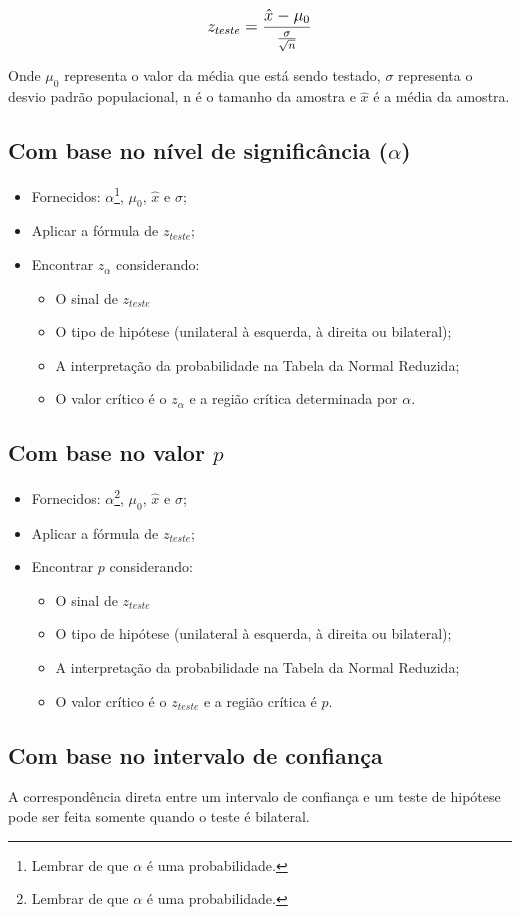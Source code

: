\[\beq{ z_{teste} = \frac{\hat{x}-\mu_0}{\frac{\sigma}{\sqrt{n}}} } \]

Onde \(\mu_0\) representa o valor da média que está sendo testado, \(\sigma\) representa o desvio padrão populacional, n é o tamanho da amostra e \(\hat{x}\) é a média da amostra.

\subsection{Com base no nível de significância (\(\alpha\))}

\begin{itemize}
	\item Fornecidos: \(\alpha\)\footnote{Lembrar de que \(\alpha\) é uma probabilidade.}, \(\mu_0\), \(\hat{x}\) e \(\sigma\);
	\item Aplicar a fórmula de \(z_{teste}\);
	\item Encontrar \(z_{\alpha}\) considerando:
	\begin{itemize}
		\item O sinal de \(z_{teste}\)
		\item O tipo de hipótese (unilateral à esquerda, à direita ou bilateral);
		\item A interpretação da probabilidade na Tabela da Normal Reduzida;
		\item O valor crítico é o \(z_{\alpha}\) e a região crítica determinada por \(\alpha\). 
	\end{itemize}
\end{itemize}		
	
\subsection{Com base no valor \(p\)}

\begin{itemize}
	\item Fornecidos: \(\alpha\)\footnote{Lembrar de que \(\alpha\) é uma probabilidade.}, \(\mu_0\), \(\hat{x}\) e \(\sigma\);
	\item Aplicar a fórmula de \(z_{teste}\);
	\item Encontrar \(p\) considerando:
	\begin{itemize}
		\item O sinal de \(z_{teste}\)
		\item O tipo de hipótese (unilateral à esquerda, à direita ou bilateral);
		\item A interpretação da probabilidade na Tabela da Normal Reduzida;
		\item O valor crítico é o \(z_{teste}\) e a região crítica é  \(p\). 
	\end{itemize}
\end{itemize}		

\subsection{Com base no intervalo de confiança}

A correspondência direta entre um intervalo de confiança e um teste de hipótese pode ser feita somente quando o teste é bilateral.


